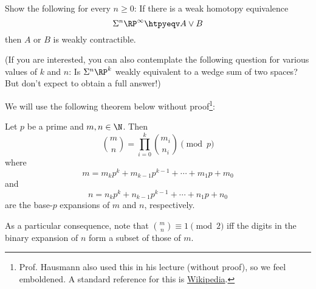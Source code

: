 \begin{exercise}
	Show the following for every $n \geq 0$:
	If there is a weak homotopy equivalence
	\begin{equation*}
		\Sigma^n \RP^\infty \htpyeqv A \vee B
	\end{equation*}
	then $A$ or $B$ is weakly contractible.

	(If you are interested, you can also contemplate the following question for various values of $k$ and $n$: 
	Is $\Sigma^n \RP^k$ weakly equivalent to a wedge sum of two spaces?
	But don't expect to obtain a full answer!)
\end{exercise}
\begin{solution}
	We will use the following theorem below without proof\footnote{Prof. Hausmann also used this in his lecture (without proof), so we feel emboldened. A standard reference for this is \href{https://en.wikipedia.org/wiki/Lucas\%27s_theorem}{Wikipedia}.}:
	\begin{theorem}
		Let $p$ be a prime and $m, n \in \N$.
		Then
		\begin{equation*}
			\binom{m}{n} = \prod_{i = 0}^k \binom{m_i}{n_i} \pmod{p}
		\end{equation*}
		where
		\begin{equation*}
			m = m_k p^k + m_{k - 1} p^{k - 1} + \cdots + m_1 p + m_0
		\end{equation*}
		and
		\begin{equation*}
			n = n_k p^k + n_{k - 1} p^{k - 1} + \cdots + n_1 p + n_0
		\end{equation*}
		are the base-$p$ expansions of $m$ and $n$, respectively.
	\end{theorem}
	As a particular consequence, note that $\binom{m}{n} \equiv 1 \pmod{2}$ iff the digits in the binary expansion of $n$ form a subset of those of $m$.


\end{solution}

